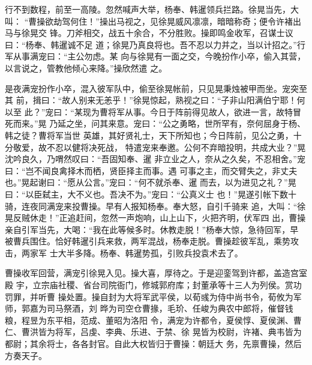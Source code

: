 行不到数程，前至一高陵。忽然喊声大举，杨奉、韩暹领兵拦路。徐晃当先，大叫：
“曹操欲劫驾何住！”操出马视之，见徐晃威风凛凛，暗暗称奇；便令许褚出马与徐晃交
锋。刀斧相交，战五十余合，不分胜败。操即鸣金收军，召谋士议曰：“杨奉、韩暹诚不足
道；徐晃乃真良将也。吾不忍以力并之，当以计招之。”行军从事满宠曰：“主公勿虑。某
向与徐晃有一面之交，今晚扮作小卒，偷入其营，以言说之，管教他倾心来降。”操欣然遣
之。

是夜满宠扮作小卒，混入彼军队中，偷至徐晃帐前，只见晃秉烛被甲而坐。宠突至其
前，揖曰：“故人别来无恙乎！”徐晃惊起，熟视之曰：“子非山阳满伯宁耶！何以至
此？”宠曰：“某现为曹将军从事。今日于阵前得见故人，欲进一言，故特冒死而来。”晃
乃延之坐，问其来意。宠曰：“公之勇略，世所罕有，奈何屈身于杨、韩之徒？曹将军当世
英雄，其好贤礼士，天下所知也；今日阵前，见公之勇，十分敬爱，故不忍以健将决死战，
特遣宠来奉邀。公何不弃暗投明，共成大业？”晃沈吟良久，乃喟然叹曰：“吾固知奉、暹
非立业之人，奈从之久矣，不忍相舍。”宠曰：“岂不闻良禽择木而栖，贤臣择主而事。遇
可事之主，而交臂失之，非丈夫也。”晃起谢曰：“愿从公言。”宠曰：“何不就杀奉、暹
而去，以为进见之礼？”晃曰：“以臣弑主，大不义也。吾决不为。”宠曰：“公真义士
也！”晃遂引帐下数十骑，连夜同满宠来投曹操。早有人报知杨奉。奉大怒，自引千骑来
追，大叫：“徐晃反贼休走！”正追赶间，忽然一声炮响，山上山下，火把齐明，伏军四
出，曹操亲自引军当先，大喝：“我在此等候多时。休教走脱！”杨奉大惊，急待回军，早
被曹兵围住。恰好韩暹引兵来救，两军混战，杨奉走脱。曹操趁彼军乱，乘势攻击，两家军
士大半多降。杨奉、韩暹势孤，引败兵投袁术去了。

曹操收军回营，满宠引徐晃入见。操大喜，厚待之。于是迎銮驾到许都，盖造宫室殿
宇，立宗庙社稷、省台司院衙门，修城郭府库；封董承等十三人为列侯。赏功罚罪，并听曹
操处置。操自封为大将军武平侯，以荀彧为侍中尚书令，荀攸为军师，郭嘉为司马祭酒，刘
晔为司空仓曹掾，毛玠、任峻为典农中郎将，催督钱粮，程昱为东平相，范成、董昭为洛阳
令，满宠为许都令，夏侯惇、夏侯渊、曹仁、曹洪皆为将军，吕虔、李典、乐进、于禁、徐
晃皆为校尉，许褚、典韦皆为都尉；其余将士，各各封官。自此大权皆归于曹操：朝廷大
务，先禀曹操，然后方奏天子。

